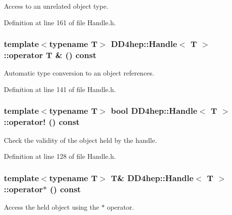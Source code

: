 Access to an unrelated object type. 

Definition at line 161 of file Handle.h.\hypertarget{class_d_d4hep_1_1_handle_a065ea7927cff8151c3fb800dbef5658c}{
\subsubsection[{operator T \&}]{\setlength{\rightskip}{0pt plus 5cm}template$<$typename T$>$ {\bf DD4hep::Handle}$<$ {\bf T} $>$::operator {\bf T} \& () const}}
\label{class_d_d4hep_1_1_handle_a065ea7927cff8151c3fb800dbef5658c}


Automatic type conversion to an object references. 

Definition at line 141 of file Handle.h.\hypertarget{class_d_d4hep_1_1_handle_a20ce72f3771ce4e1a3b58d652efda06d}{
\subsubsection[{operator!}]{\setlength{\rightskip}{0pt plus 5cm}template$<$typename T$>$ bool {\bf DD4hep::Handle}$<$ {\bf T} $>$::operator! () const}}
\label{class_d_d4hep_1_1_handle_a20ce72f3771ce4e1a3b58d652efda06d}


Check the validity of the object held by the handle. 

Definition at line 128 of file Handle.h.\hypertarget{class_d_d4hep_1_1_handle_a9524715e3d0523206bc51be8c13deb32}{
\subsubsection[{operator$\ast$}]{\setlength{\rightskip}{0pt plus 5cm}template$<$typename T$>$ {\bf T}\& {\bf DD4hep::Handle}$<$ {\bf T} $>$::operator$\ast$ () const}}
\label{class_d_d4hep_1_1_handle_a9524715e3d0523206bc51be8c13deb32}


Access the held object using the $\ast$ operator. 


